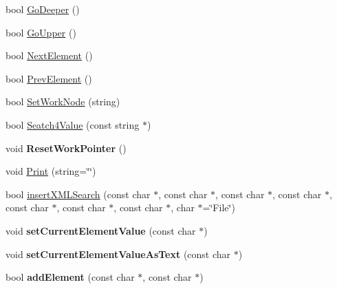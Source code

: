 \begin{DoxyCompactItemize}
\item 
bool \hyperlink{classXMLParser_aff335a6c46a39700c013d2996cde7c52}{GoDeeper} ()
\item 
bool \hyperlink{classXMLParser_a694016bf62d05c8834d189510f2189ed}{GoUpper} ()
\item 
bool \hyperlink{classXMLParser_ab67f961bd0f1db53d7bd57f2ae18610d}{NextElement} ()
\item 
bool \hyperlink{classXMLParser_a5a860f3cc8d9f72ffbb062683f9c2e18}{PrevElement} ()
\item 
bool \hyperlink{classXMLParser_ab05e61d34c570a1d08271a73203966a0}{SetWorkNode} (string)
\item 
bool \hyperlink{classXMLParser_aed814f771d1ed12b0f27288c12d9a59d}{Seatch4Value} (const string $\ast$)
\item 
\hypertarget{classXMLParser_af91f5f27f5c2d7b5faed921831d02ff1}{
void {\bfseries ResetWorkPointer} ()}
\label{classXMLParser_af91f5f27f5c2d7b5faed921831d02ff1}

\item 
void \hyperlink{classXMLParser_a29bc5cb3c6c35cdc5020df21a8f9ad28}{Print} (string=\char`\"{}\char`\"{})
\item 
bool \hyperlink{classXMLParser_ac5ac0a78d6f4db3d7361d7397e7ff925}{insertXMLSearch} (const char $\ast$, const char $\ast$, const char $\ast$, const char $\ast$, const char $\ast$, const char $\ast$, const char $\ast$, char $\ast$=\char`\"{}File\char`\"{})
\item 
\hypertarget{classXMLParser_af34d73d67ff8772381665867fd4f136a}{
void {\bfseries setCurrentElementValue} (const char $\ast$)}
\label{classXMLParser_af34d73d67ff8772381665867fd4f136a}

\item 
\hypertarget{classXMLParser_a4ba3530ec5ad32c46232d61b37e55ce7}{
void {\bfseries setCurrentElementValueAsText} (const char $\ast$)}
\label{classXMLParser_a4ba3530ec5ad32c46232d61b37e55ce7}

\item 
\hypertarget{classXMLParser_a81328b723e9f1eef28b3c93f87220aa5}{
bool {\bfseries addElement} (const char $\ast$, const char $\ast$)}
\label{classXMLParser_a81328b723e9f1eef28b3c93f87220aa5}


\end{DoxyCompactItemize}
